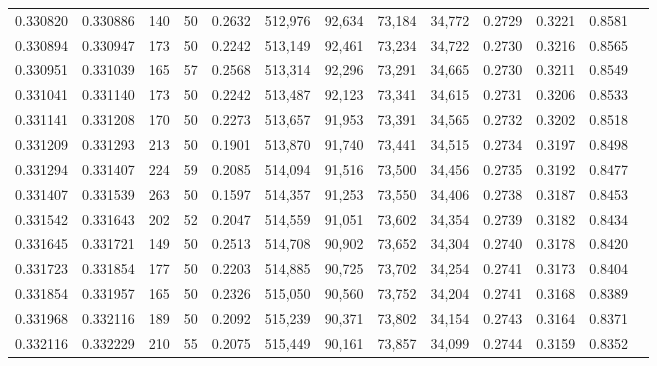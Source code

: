 \begin{tabular}{rrrrrrrrrrrrr}
0.330820 & 0.330886 &   140 &  50 &                                     0.2632 & 512,976 &  92,634 &  73,184 &  34,772 & 0.2729 & 0.3221 & 0.8581 \\
0.330894 & 0.330947 &   173 &  50 &                                     0.2242 & 513,149 &  92,461 &  73,234 &  34,722 & 0.2730 & 0.3216 & 0.8565 \\
0.330951 & 0.331039 &   165 &  57 &                                     0.2568 & 513,314 &  92,296 &  73,291 &  34,665 & 0.2730 & 0.3211 & 0.8549 \\
0.331041 & 0.331140 &   173 &  50 &                                     0.2242 & 513,487 &  92,123 &  73,341 &  34,615 & 0.2731 & 0.3206 & 0.8533 \\
0.331141 & 0.331208 &   170 &  50 &                                     0.2273 & 513,657 &  91,953 &  73,391 &  34,565 & 0.2732 & 0.3202 & 0.8518 \\
0.331209 & 0.331293 &   213 &  50 &                                     0.1901 & 513,870 &  91,740 &  73,441 &  34,515 & 0.2734 & 0.3197 & 0.8498 \\
0.331294 & 0.331407 &   224 &  59 &                                     0.2085 & 514,094 &  91,516 &  73,500 &  34,456 & 0.2735 & 0.3192 & 0.8477 \\
0.331407 & 0.331539 &   263 &  50 &                                     0.1597 & 514,357 &  91,253 &  73,550 &  34,406 & 0.2738 & 0.3187 & 0.8453 \\
0.331542 & 0.331643 &   202 &  52 &                                     0.2047 & 514,559 &  91,051 &  73,602 &  34,354 & 0.2739 & 0.3182 & 0.8434 \\
0.331645 & 0.331721 &   149 &  50 &                                     0.2513 & 514,708 &  90,902 &  73,652 &  34,304 & 0.2740 & 0.3178 & 0.8420 \\
0.331723 & 0.331854 &   177 &  50 &                                     0.2203 & 514,885 &  90,725 &  73,702 &  34,254 & 0.2741 & 0.3173 & 0.8404 \\
0.331854 & 0.331957 &   165 &  50 &                                     0.2326 & 515,050 &  90,560 &  73,752 &  34,204 & 0.2741 & 0.3168 & 0.8389 \\
0.331968 & 0.332116 &   189 &  50 &                                     0.2092 & 515,239 &  90,371 &  73,802 &  34,154 & 0.2743 & 0.3164 & 0.8371 \\
0.332116 & 0.332229 &   210 &  55 &                                     0.2075 & 515,449 &  90,161 &  73,857 &  34,099 & 0.2744 & 0.3159 & 0.8352 \\

\end{tabular}
